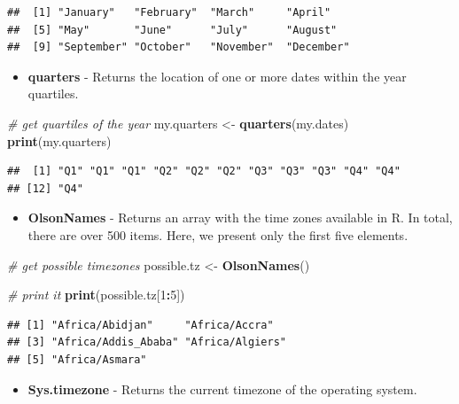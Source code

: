\documentclass[11pt,]{book}
\newenvironment{Shaded}{\begin{snugshade}}{\end{snugshade}}
\newcommand{\KeywordTok}[1]{\textcolor[rgb]{0.27,0.27,0.27}{\textbf{#1}}}
\newcommand{\DecValTok}[1]{\textcolor[rgb]{0.06,0.06,0.06}{#1}}
\newcommand{\StringTok}[1]{\textcolor[rgb]{0.5,0.5,0.5}{#1}}
\newcommand{\CommentTok}[1]{\textcolor[rgb]{0.56,0.35,0.01}{\textit{#1}}}
\newcommand{\OperatorTok}[1]{\textcolor[rgb]{0.81,0.36,0.00}{\textbf{#1}}}
\newcommand{\NormalTok}[1]{#1}
\providecommand{\tightlist}{%
  \setlength{\itemsep}{0pt}\setlength{\parskip}{0pt}}
\begin{document}
\begin{verbatim}
##  [1] "January"   "February"  "March"     "April"    
##  [5] "May"       "June"      "July"      "August"   
##  [9] "September" "October"   "November"  "December"
\end{verbatim}

\begin{itemize}
\tightlist
\item
  \textbf{quarters} - Returns the location of one or more dates within
  the year quartiles. 
\end{itemize}

\begin{Shaded}
\begin{Highlighting}[]
\CommentTok{# get quartiles of the year}
\NormalTok{my.quarters <-}\StringTok{ }\KeywordTok{quarters}\NormalTok{(my.dates)}
\KeywordTok{print}\NormalTok{(my.quarters)}
\end{Highlighting}
\end{Shaded}

\begin{verbatim}
##  [1] "Q1" "Q1" "Q1" "Q2" "Q2" "Q2" "Q3" "Q3" "Q3" "Q4" "Q4"
## [12] "Q4"
\end{verbatim}

\begin{itemize}
\tightlist
\item
  \textbf{OlsonNames} - Returns an array with the time zones available
  in R. In total, there are over 500 items. Here, we present only the
  first five elements. 
\end{itemize}

\begin{Shaded}
\begin{Highlighting}[]
\CommentTok{# get possible timezones}
\NormalTok{possible.tz <-}\StringTok{ }\KeywordTok{OlsonNames}\NormalTok{()}

\CommentTok{# print it}
\KeywordTok{print}\NormalTok{(possible.tz[}\DecValTok{1}\OperatorTok{:}\DecValTok{5}\NormalTok{])}
\end{Highlighting}
\end{Shaded}

\begin{verbatim}
## [1] "Africa/Abidjan"     "Africa/Accra"      
## [3] "Africa/Addis_Ababa" "Africa/Algiers"    
## [5] "Africa/Asmara"
\end{verbatim}

\begin{itemize}
\tightlist
\item
  \textbf{Sys.timezone} - Returns the current timezone of the operating
  system. 
\end{itemize}
\end{document}
